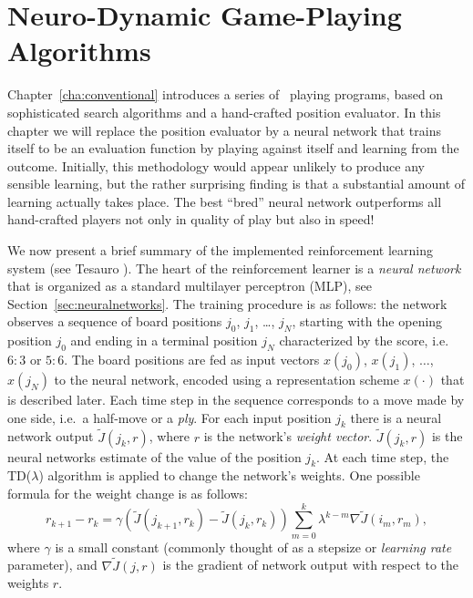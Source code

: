 \chapter{Neuro-Dynamic Game-Playing Algorithms} \label{cha:impl:reinforcement}
Chapter~\ref{cha:conventional} introduces a series of \Abalone\ playing programs, based on sophisticated search algorithms and a hand-crafted position evaluator. In this chapter we will replace the position evaluator by a neural network that trains itself to be an evaluation function by playing against itself and learning from the outcome. Initially, this methodology would appear unlikely to produce any sensible learning, but the rather surprising finding is that a substantial amount of learning actually takes place. The best ``bred'' neural network outperforms all hand-crafted players not only in quality of play but also in speed!

We now present a brief summary of the implemented reinforcement learning system (see Tesauro \cite{lig*Tesauro95}). The heart of the reinforcement learner is a \emph{neural network} that is organized as a standard multilayer perceptron (MLP), see Section~\ref{sec:neuralnetworks}. The training procedure is as follows: the network observes a sequence of board positions $j_0$, $j_1$, \ldots, $j_N$, starting with the opening position $j_0$ and ending in a terminal position $j_N$ characterized by the score, i.e.~$6:3$ or $5:6$. The board positions are fed as input vectors $x(j_0)$, $x(j_1)$, $\ldots$, $x(j_N)$ to the neural network, encoded using a representation scheme $x(\cdot)$ that is described later. Each time step in the sequence corresponds to a move made by one side, i.e.~a half-move or a \emph{ply}. For each input position $j_k$ there is a neural network output $\tilde J(j_k,r)$, where $r$ is the network's \emph{weight vector}. $\tilde J(j_k,r)$ is the neural networks estimate of the value of the position $j_k$.  At each time step, the TD($\lambda$) algorithm is applied to change the network's weights. One possible formula for the weight change is as follows:
\begin{equation} \label {eq:reinforcement:brief}
r_{k+1} - r_k = \gamma \left(\tilde J(j_{k+1},r_k) - \tilde J(j_{k},r_k)\right) \sum_{m=0}^k \lambda^{k-m} \nabla \tilde J(i_m,r_m),
\end{equation}
where $\gamma$ is a small constant (commonly thought of as a stepsize or \emph{learning rate} parameter), and $\nabla \tilde J(j,r)$ is the gradient of network output with respect to the weights $r$. 

